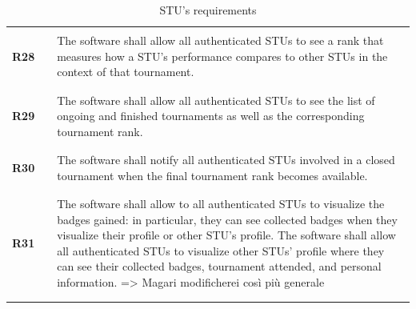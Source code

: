 \begin{longtable}[H]{l l p{12cm}}
                 &        &                                                                                                                                                                                                                             \\\hline & & \\   
    \textbf{R28} & \vline & The software shall allow all authenticated STUs to see a rank that measures how a STU's performance compares to other STUs in the context of that tournament.                                                            \\
                 &        &                                                                                                                                                                                                                             \\\hline & & \\   
    \textbf{R29} & \vline & The software shall allow all authenticated STUs to see the list of ongoing and finished tournaments as well as the corresponding tournament rank.                                                                        \\
                 &        &                                                                                                                                                                                                                             \\\hline & & \\   
    \textbf{R30} & \vline & The software shall notify all authenticated STUs involved in a closed tournament when the final tournament rank becomes available.                                                                                          \\
                 &        &                                                                                                                                                                                                                             \\\hline & & \\   
    \textbf{R31} & \vline & The software shall allow to all authenticated STUs to visualize the badges gained: in particular, they can see collected badges when they visualize their profile or other STU's profile.       
                            {\color{red} The software shall allow all authenticated STUs to visualize other STUs' profile where they can see their collected badges, tournament attended, and personal information. => Magari modificherei così più generale} \\
                 &        &                                                                                                                                                                                                                             \\
    \hline
    \caption{STU's requirements}
\end{longtable}

